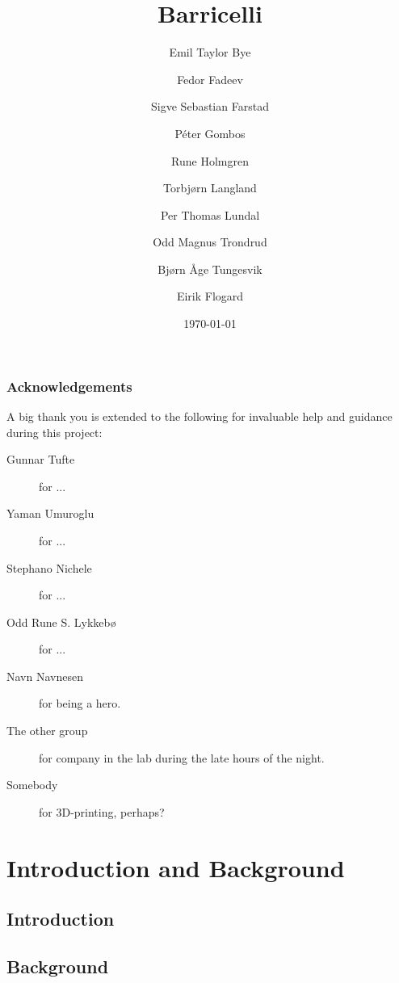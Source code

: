 \documentclass[a4paper]{report}
\title{Barricelli}
\date{\today}
\author{Emil Taylor Bye
     \and Fedor Fadeev
     \and Sigve Sebastian Farstad
     \and Péter Gombos
     \and Rune Holmgren
     \and Torbjørn Langland
     \and Per Thomas Lundal
     \and Odd Magnus Trondrud
     \and Bjørn Åge Tungesvik
     \and Eirik Flogard
}
\begin{document}



\newpage
\thispagestyle{empty}
\mbox{}
\newpage

\begin{abstract}
	
\end{abstract}

\thispagestyle{empty}
\section*{Acknowledgements}
A big thank you is extended to the following for invaluable help and guidance during this project:

\begin{description}
\item[Gunnar Tufte] for ...
\item[Yaman Umuroglu] for ...
\item[Stephano Nichele] for ...
\item[Odd Rune S. Lykkebø] for ...
\item[Navn Navnesen] for being a hero.
\item[The other group] for company in the lab during the late hours of the night.
\item[Somebody] for 3D-printing, perhaps?
\end{description}

\setcounter{page}{3}

\tableofcontents
\newpage

\listoffigures
\listoftables
\listofalgorithms
\renewcommand{\lstlistlistingname}{List of Listings}
\lstlistoflistings

\newpage
\setcounter{page}{1}

\part{Introduction and Background}

\chapter{Introduction}
	

\chapter{Background}
	
\end{document}
